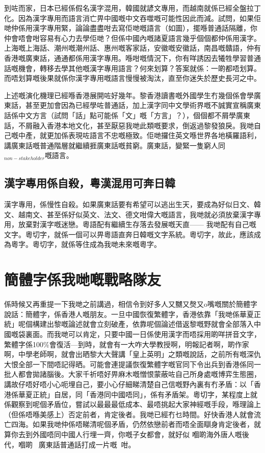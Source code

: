 到咗而家，日本已經係假名漢字混用，韓國就諺文專用，而越南就係已經全盤拉丁化。因為漢字專用而語言消亡畀中國嘅中文吞噬嘅可能性因此而減。試問，如果佢哋仲係用漢字專用緊，論論盡盡咁去寫佢哋嘅語言（如圖），擺喺普通話隔離，你仲會唔會咁容易有心力去學佢哋？但係中國內嘅諸夏語言幾乎個個都仲係用漢字。上海嘅上海話、潮州嘅潮州話、惠州嘅客家話，安徽嘅安徽話，南昌嘅贛語，仲有香港嘅廣東話，通通都係用漢字專用。喺咁嘅情況下，你有咩誘因去犧牲學習普通話嘅機會，轉移去學其他嘅漢字專用語言？何來划算？答案就係：一啲都唔划算。而唔划算嘅後果就係你漢字專用嘅語言慢慢被淘汰，直至你迷失於歷史長河之中。

上述嘅演化機理已經喺香港展開咗好幾年。黎香港讀書嘅外國學生冇幾個係會學廣東話，甚至更加會因為已經學咗普通話，加上漢字同中文學術界嘅不誠實宣稱廣東話係中文方言（試問「話」點可能係「文」嘅「方言」？），個個都不屑學廣東話，不屑融入香港本地文化，甚至厭惡我哋此類嘅要求，倒返過黎發狼戾。我哋自己嘅中產，就更加係表現咗語言不忠嘅極致。佢哋攞住英文喺世界各地橫羅語利，講廣東話嘅普通階層就繼續捱廣東話嘅貧窮。廣東話，變緊一隻窮人同$_{non-stakeholder}$嘅語言。

\subsection*{漢字專用係自殺，粵漢混用可奔日韓}
漢字專用，係慢性自殺。如果廣東話要有希望可以逃出生天，要成為好似日文、韓文、越南文、甚至係好似英文、法文、德文咁偉大嘅語言，我哋就必須放棄漢字專用，放棄對漢字嘅迷戀。粵語配有繼續生存落去發展嘅天直—— 我哋配有自己嘅文字。粵切字，就係一個可以畀粵語直奔日韓嘅文字系統。粵切字，故此，應該成為粵字。粵切字，就係等住成為我哋未來嘅粵字。





\section{簡體字係我哋嘅戰略隊友}

係時候又再重提一下我哋之前講過，相信令到好多人又嬲又㷫又o嘴嘅關於簡體字說話：簡體字，係香港人嘅朋友。一旦中國恢復繁體字，香港依靠「我哋係華夏正統」呢個構建出黎嘅論述就會立刻破產，依靠呢個論述借返黎嘅野就會全部落入中國嘅袋裏面。而我哋可以肯定，只要中國一日係使用漢字而唔採用啲咩拼音文字，繁體字係100\%會復活—到時，就會有一大咋大學教授啊，明報記者啊，啲作家啊，中學老師啊，就會出晒黎大大聲講「皇上英明」之類嘅說話，之前所有嘅深仇大恨全部一下間唔記得晒。可能會連提議恢復繁體字嘅官同下令出兵到香港係同一批人都會拋諸腦後。大家千祈唔好畀麻木嘅憎恨蒙蔽咗自己所身處嘅博弈生態圈，講故仔唔好唔小心呃埋自己，要小心仔細睇清楚自己信嘅野內裏有冇矛盾：以「香港係華夏正統」自居，同「香港同中國唔同」，係有矛盾架。粵切字，某程度上就係觀察到呢個矛盾位，嘗試以最最最低成本、最唔挑起大家神經嘅手段，喺理論上（但係唔喺美感上）否定前者，肯定後者。我哋已經冇乜時間。好快香港人就會流亡四海。如果我哋仲係唔睇清呢個矛盾，仍然依戀前者而唔全面瞓身肯定後者，就算你去到外國唔同中國人行埋一齊，你嘅子女都會，就好似 嗰啲海外唐人嘅後代，嗰啲廣東話普通話打成一片嘅咁。

